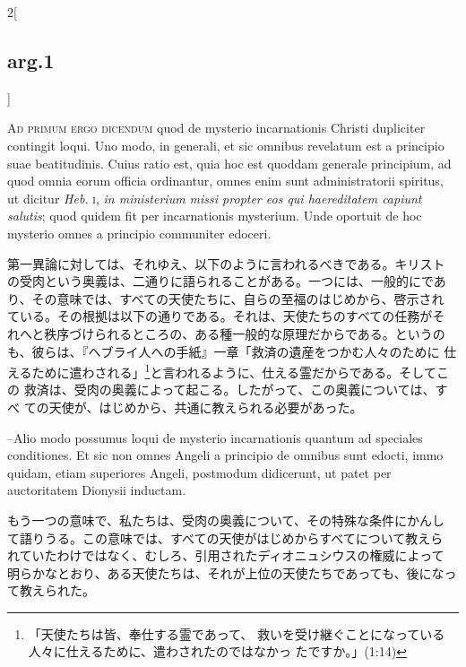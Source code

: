 \documentclass[paper=a4paper,fontsize=10pt,jafontsize=9pt,titlepage]{jlreq}
\begin{document}
\begin{paracol}{2}[\subsection{arg.1}]
\switchcolumn*[\subsection{ad.1}]

{\scshape Ad primum ergo dicendum} quod de mysterio incarnationis
Christi dupliciter contingit loqui. Uno modo, in generali, et sic
omnibus revelatum est a principio suae beatitudinis. Cuius ratio est,
quia hoc est quoddam generale principium, ad quod omnia eorum officia
ordinantur, omnes enim sunt administratorii spiritus, ut dicitur
{\itshape Heb.} {\scshape i}, {\itshape in ministerium missi propter
eos qui haereditatem capiunt salutis}; quod quidem fit per
incarnationis mysterium. Unde oportuit de hoc mysterio omnes a
principio communiter edoceri.

\switchcolumn

第一異論に対しては、それゆえ、以下のように言われるべきである。キリスト
の受肉という奥義は、二通りに語られることがある。一つには、一般的にであ
り、その意味では、すべての天使たちに、自らの至福のはじめから、啓示され
ている。その根拠は以下の通りである。それは、天使たちのすべての任務がそ
れへと秩序づけられるところの、ある種一般的な原理だからである。というの
も、彼らは、『ヘブライ人への手紙』一章「救済の遺産をつかむ人々のために
仕えるために遣わされる」\footnote{「天使たちは皆、奉仕する霊であって、
救いを受け継ぐことになっている人々に仕えるために、遣わされたのではなかっ
たですか。」(1:14)}と言われるように、仕える霊だからである。そしてこの
救済は、受肉の奥義によって起こる。したがって、この奥義については、すべ
ての天使が、はじめから、共通に教えられる必要があった。

\switchcolumn*

--Alio modo possumus loqui de mysterio incarnationis quantum ad
speciales conditiones. Et sic non omnes Angeli a principio de omnibus
sunt edocti, immo quidam, etiam superiores Angeli, postmodum
didicerunt, ut patet per auctoritatem Dionysii inductam.

\switchcolumn

もう一つの意味で、私たちは、受肉の奥義について、その特殊な条件にかんし
て語りうる。この意味では、すべての天使がはじめからすべてについて教えら
れていたわけではなく、むしろ、引用されたディオニュシウスの権威によって
明らかなとおり、ある天使たちは、それが上位の天使たちであっても、後になっ
て教えられた。

\switchcolumn*[\subsection{ad.2}]


\end{paracol}
\end{document}
